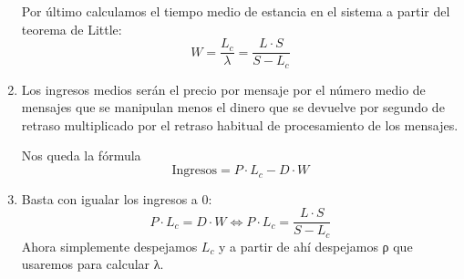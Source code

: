 \begin{problem}[7]
\begin{enumerate}
Por último calculamos el tiempo medio de estancia en el sistema a partir del teorema de Little:
\[W = \frac{L_c}{λ}=\frac{L\cdot S}{S-L_c}\]

\item

Los ingresos medios serán el precio por mensaje por el número medio de mensajes que se manipulan menos el dinero que se devuelve por segundo de retraso multiplicado por el retraso habitual de procesamiento de los mensajes.

Nos queda la fórmula
\[\text{Ingresos} = P \cdot L_c - D \cdot W\]

\item

Basta con igualar los ingresos a 0:
\[P\cdot L_c = D \cdot W \iff P \cdot L_c = \frac{L\cdot S}{S-L_c} \]
Ahora simplemente despejamos $L_c$ y a partir de ahí despejamos ρ que usaremos para calcular λ.

\end{enumerate}

\end{problem}


